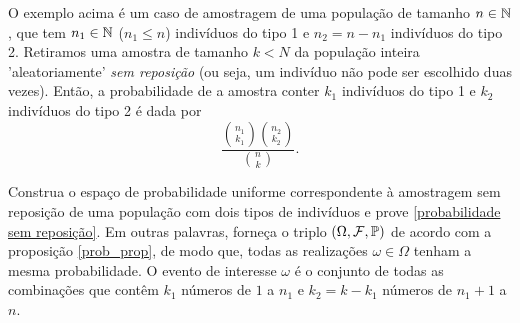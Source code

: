 O exemplo acima é um caso de amostragem de uma população de tamanho $n \in \mathbb{N}$, que tem $n_1 \in \mathbb{N}$ ($n_1 \leq n$) indivíduos do tipo 1 e $n_2 = n-n_1$ indivíduos do tipo 2. Retiramos uma amostra de tamanho $k<N$ da população inteira 'aleatoriamente' {\it sem reposição} (ou seja, um indivíduo não pode ser escolhido duas vezes). Então, a probabilidade de a amostra conter $k_1$ indivíduos do tipo 1 e $k_2$ indivíduos do tipo 2 é dada por 
\begin{equation}
\label{probabilidade sem reposição}
\frac{\binom{n_1}{k_1}\binom{n_2}{k_2}}{\binom{n}{k}}. 
\end{equation}

\begin{exercise}
    Construa o espaço de probabilidade uniforme correspondente à amostragem sem reposição de uma população com dois tipos de indivíduos e prove \eqref{probabilidade sem reposição}. 
    Em outras palavras, forneça o triplo $(\Omega,\mathcal F,\mathbb{P})$ de acordo com a proposição \ref{prob_prop}, de modo que, todas as realizações $\omega\in\Omega$ tenham a mesma probabilidade. O evento de interesse $\omega$ é o conjunto de todas as combinações que contêm $k_1$ números de $1$ a $n_1$ e $k_2 = k - k_1$ números de $n_1+1$ a $n$.   
\end{exercise}

